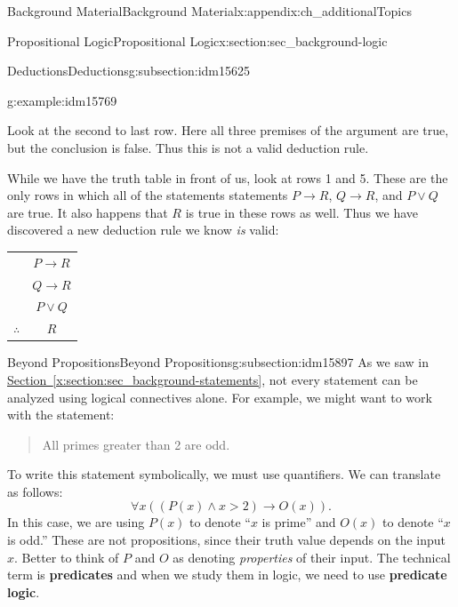 \documentclass[oneside,10pt,]{book}
\newcommand{\terminology}[1]{\textbf{#1}}
\numberwithin{equation}{chapter}
\newcommand{\hrulethin}  {\noalign{\hrule height 0.04em}}
\def\imp{\rightarrow}
\newcommand{\gt}{>}
\begin{document}
\begin{appendixptx}{Background Material}{}{Background Material}{}{}{x:appendix:ch_additionalTopics}
\begin{sectionptx}{Propositional Logic}{}{Propositional Logic}{}{}{x:section:sec_background-logic}
\begin{subsectionptx}{Deductions}{}{Deductions}{}{}{g:subsection:idm15625}
\begin{example}{}{g:example:idm15769}
\begin{sidebyside}{1}{0}{0}{0}
\begin{sbspanel}{1}
\end{sbspanel}%
\end{sidebyside}%
\par
Look at the second to last row.  Here all three premises of the argument are true, but the conclusion is false.  Thus this is not a valid deduction rule.%
\par
While we have the truth table in front of us, look at rows 1 and 5.  These are the only rows in which all of the statements statements \(P \imp R\), \(Q \imp R\), and \(P\vee Q\) are true.  It also happens that \(R\) is true in these rows as well.  Thus we have discovered a new deduction rule we know \emph{is} valid:%
\begin{sidebyside}{1}{0}{0}{0}%
\begin{sbspanel}{1}%
{\centering%
\begin{tabular}{cc}
&\(P \imp R\)\tabularnewline[0pt]
&\(Q \imp R\)\tabularnewline[0pt]
&\(P \vee Q\)\tabularnewline\hrulethin
\(\therefore\)&\(R\)
\end{tabular}
\par}
\end{sbspanel}%
\end{sidebyside}%
\end{example}
\end{subsectionptx}
%
%
\typeout{************************************************}
\typeout{************************************************}
%
\begin{subsectionptx}{Beyond Propositions}{}{Beyond Propositions}{}{}{g:subsection:idm15897}
As we saw in \hyperref[x:section:sec_background-statements]{Section~\ref{x:section:sec_background-statements}}, not every statement can be analyzed using logical connectives alone.  For example, we might want to work with the statement:%
\begin{quote}%
All primes greater than 2 are odd.%
\end{quote}
To write this statement symbolically, we must use quantifiers.  We can translate as follows:%
\begin{equation*}
\forall x ((P(x) \wedge x \gt 2) \imp O(x)).
\end{equation*}
In this case, we are using \(P(x)\) to denote ``\(x\) is prime'' and \(O(x)\) to denote ``\(x\) is odd.''  These are not propositions, since their truth value depends on the input \(x\).  Better to think of \(P\) and \(O\) as denoting \emph{properties} of their input.  The technical term is \terminology{predicates} and when we study them in logic, we need to use \terminology{predicate logic}.%

\end{subsectionptx}
\end{sectionptx}
\end{appendixptx}
\end{document}
